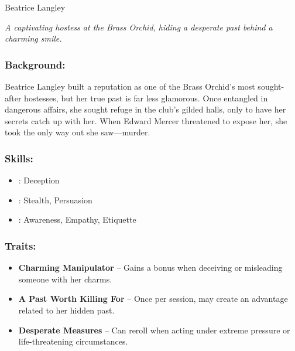 \begin{WyrdFullNPC}[%
		name=Beatrice Langley,%
		description=The Orchid’s Most Enchanting Hostess,%
		float=!t%
	]{Beatrice Langley}
	
    \emph{A captivating hostess at the Brass Orchid, hiding a desperate past behind a charming smile.}
    
    \subsubsection*{Background:}
    Beatrice Langley built a reputation as one of the Brass Orchid’s most sought-after hostesses, but her true past is far less glamorous. Once entangled in dangerous affairs, she sought refuge in the club’s gilded halls, only to have her secrets catch up with her. When Edward Mercer threatened to expose her, she took the only way out she saw—murder.
    
    \subsubsection*{Skills:}
    \begin{itemize}
       \item \Expert: Deception
        \item \Skilled: Stealth, Persuasion
        \item \Novice: Awareness, Empathy, Etiquette
    \end{itemize}
    
    \subsubsection*{Traits:}
    \begin{itemize}
        \item \textbf{Charming Manipulator} – Gains a bonus when deceiving or misleading someone with her charms.
        \item \textbf{A Past Worth Killing For} – Once per session, may create an advantage related to her hidden past.
        \item \textbf{Desperate Measures} – Can reroll when acting under extreme pressure or life-threatening circumstances.
    \end{itemize}
\end{WyrdFullNPC}
